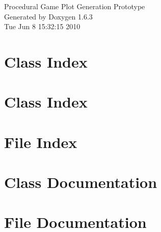 \documentclass[a4paper]{book}
\begin{document}
\hypersetup{pageanchor=false}
\begin{titlepage}
\vspace*{7cm}
\begin{center}
{\Large Procedural Game Plot Generation Prototype }\\
\vspace*{1cm}
{\large Generated by Doxygen 1.6.3}\\
\vspace*{0.5cm}
{\small Tue Jun 8 15:32:15 2010}\\
\end{center}
\end{titlepage}
\clearemptydoublepage
{}
\tableofcontents
\clearemptydoublepage
{}
\hypersetup{pageanchor=true}
\chapter{Class Index}

\chapter{Class Index}

\chapter{File Index}

\chapter{Class Documentation}


























\chapter{File Documentation}






























\printindex
\end{document}
